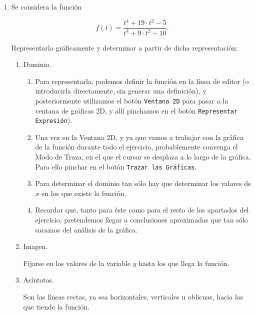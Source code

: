 \begin{enumerate}[leftmargin=*]
\item Se considera la función

\[
\ f(t)=\frac{t^{4} +19\cdot t^{2} - 5}{t^{4} +9\cdot t^{2} - 10}.
\]

Representarla gráficamente y determinar a partir de dicha representación:


\begin{enumerate}

\item  Dominio.

\begin{indicacion}
{
\begin{enumerate}

\item Para representarla, podemos definir la función en la línea
de editor (o introducirla directamente, sin generar una
definición), y posteriormente utilizamos el botón \texttt{Ventana
2D} para pasar a la ventana de gráficas 2D, y allí pinchamos en el
botón \texttt{Representar Expresión}).

\item Una vez en la Ventana 2D, y ya que vamos a trabajar con la
gráfica de la función durante todo el ejercicio, probablemente
convenga el Modo de Traza, en el que el cursor se desplaza a lo
largo de la gráfica. Para ello pinchar en el botón \texttt{Trazar
las Gráficas}.

\item Para determinar el dominio tan sólo hay que determinar los
valores de $x$ en los que existe la función.

\item Recordar que, tanto para éste como para el resto de los
apartados del ejercicio, pretendemos llegar a conclusiones
aproximadas que tan sólo sacamos del análisis de la gráfica.

\end{enumerate}

}
\end{indicacion}


\item  Imagen.

\begin{indicacion}
{Fijarse en los valores de la variable $y$ hasta los que llega la
función.}
\end{indicacion}


\item  Asíntotas.

\begin{indicacion}
{Son las líneas rectas, ya sea horizontales, verticales u
oblicuas, hacia las que tiende la función.}
\end{indicacion}


\end{enumerate}
\end{enumerate}

